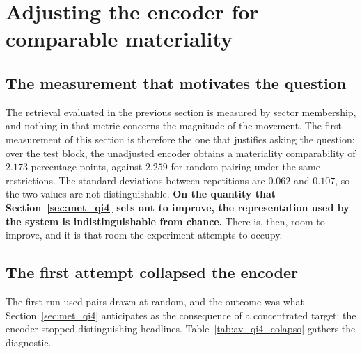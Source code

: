 \section{Adjusting the encoder for comparable materiality}
\label{sec:av_qi4}

\subsection{The measurement that motivates the question}

The retrieval evaluated in the previous section is measured by sector membership, and nothing in
that metric concerns the magnitude of the movement. The first measurement of this section is
therefore the one that justifies asking the question: over the test block, the unadjusted encoder
obtains a materiality comparability of $2.173$ percentage points, against $2.259$ for random
pairing under the same restrictions. The standard deviations between repetitions are $0.062$ and
$0.107$, so the two values are not distinguishable. \textbf{On the quantity that
Section~\ref{sec:met_qi4} sets out to improve, the representation used by the system is
indistinguishable from chance.} There is, then, room to improve, and it is that room the
experiment attempts to occupy.

\subsection{The first attempt collapsed the encoder}

The first run used pairs drawn at random, and the outcome was what Section~\ref{sec:met_qi4}
anticipates as the consequence of a concentrated target: the encoder stopped distinguishing
headlines. Table~\ref{tab:av_qi4_colapso} gathers the diagnostic.

